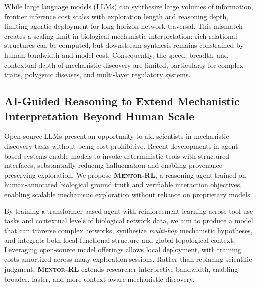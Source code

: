 \documentclass[thesis,letterpaper,12pt]{utthesis}
\begin{document}
While large language models (LLMs) can synthesize large volumes of information, frontier inference cost scales with exploration length and reasoning depth, limiting agentic deployment for long-horizon network traversal. This mismatch creates a scaling limit in biological mechanistic interpretation: rich relational structures can be computed, but downstream synthesis remains constrained by human bandwidth and model cost. Consequently, the speed, breadth, and contextual depth of mechanistic discovery are limited, particularly for complex traits, polygenic diseases, and multi-layer regulatory systems.

\subsection{AI-Guided Reasoning to Extend Mechanistic Interpretation Beyond Human Scale}
Open-source LLMs present an opportunity to aid scientists in mechanistic discovery tasks without being cost prohibitive. Recent developments in agent-based systems enable models to invoke deterministic tools with structured interfaces, substantially reducing hallucination and enabling provenance-preserving exploration. We propose \textbf{\textsc{Mentor-RL}}, a reasoning agent trained on human-annotated biological ground truth and verifiable interaction objectives, enabling scalable mechanistic exploration without reliance on proprietary models.

By training a transformer-based agent with reinforcement learning across tool-use tasks and contextual levels of biological network data, we aim to produce a model that can traverse complex networks, synthesize \textit{multi-hop} mechanistic hypotheses, and integrate both local functional structure and global topological context. Leveraging open-source model offerings allows local deployment, with training costs amortized across many exploration sessions. Rather than replacing scientific judgment, \textbf{\textsc{Mentor-RL}} extends researcher interpretive bandwidth, enabling broader, faster, and more context-aware mechanistic discovery.
\end{document}
